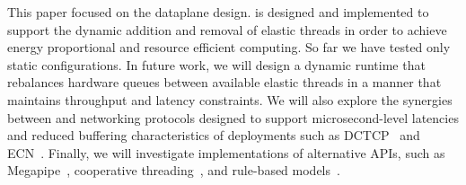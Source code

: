  This paper focused on the \ix dataplane
design. \ix is designed and implemented to support the dynamic
addition and removal of elastic threads in order to achieve energy
proportional and resource efficient computing. So far we have tested
only static configurations. In future work, we will design a dynamic
runtime that rebalances hardware queues between available elastic
threads in a manner that maintains throughput and latency constraints.
%
We will also explore the synergies between \ix and networking
protocols designed to support microsecond-level latencies and reduced
buffering characteristics of \ix deployments such as
DCTCP~\cite{DBLP:conf/sigcomm/AlizadehGMPPPSS10} and
ECN~\cite{ramakrishnan2001addition}. Finally, we will investigate \ix
implementations of alternative APIs, such as
Megapipe~\cite{han2012megapipe}, cooperative
threading~\cite{capriccio}, and rule-based
models~\cite{stutsman_2013}.







